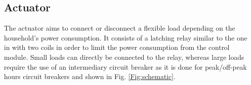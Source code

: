 \documentclass[conference]{IEEEtran}
\begin{document}
\subsection{Actuator}
The actuator aims to connect or disconnect a flexible load depending on the household's power consumption. It consists of a latching relay similar to the one in \cite{adafruit:latchingrelay} with two coils in order to limit the power consumption from the control module. 
Small loads can directly be connected to the relay, whereas large loads require the use of an intermediary circuit breaker as it is done for peak/off-peak hours circuit breakers \cite{schneider:circuitbreaker} and shown in Fig. \ref{Fig:schematic}.
\end{document}
